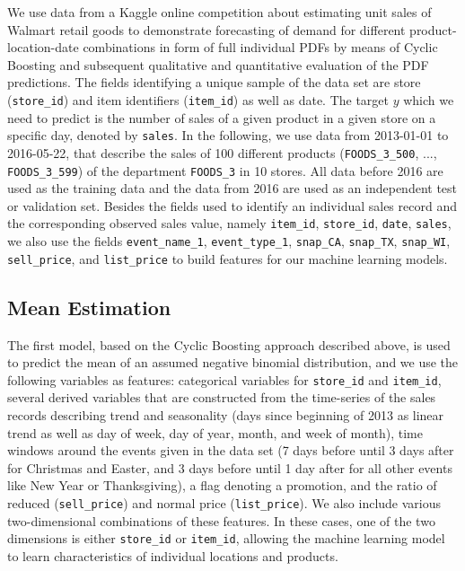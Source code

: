 \documentclass[BCOR=1mm, DIV=calc,10pt,
twoside=true,
twocolumn,
headings=normal]{scrartcl}
\begin{document}
We use data from a Kaggle online competition about estimating unit sales of Walmart retail goods \cite{kaggle_data} to demonstrate forecasting of demand for different product-location-date combinations in form of full individual PDFs by means of Cyclic Boosting and subsequent qualitative and quantitative evaluation of the PDF predictions. The fields identifying a unique sample of the data set are store (\texttt{store\_id}) and item identifiers (\texttt{item\_id}) as well as date. The target $y$ which we need to predict is the number of sales of a given product in a given store on a specific day, denoted by \texttt{sales}. In the following, we use data from 2013-01-01 to 2016-05-22, that describe the sales of 100 different products (\texttt{FOODS\_3\_500}, ..., \texttt{FOODS\_3\_599}) of the department \texttt{FOODS\_3} in 10 stores. All data before 2016 are used as the training data and the data from 2016 are used as an independent test or validation set. Besides the fields used to identify an individual sales record and the corresponding observed sales value, namely \texttt{item\_id}, \texttt{store\_id}, \texttt{date}, \texttt{sales}, we also use the fields \texttt{event\_name\_1}, \texttt{event\_type\_1}, \texttt{snap\_CA}, \texttt{snap\_TX}, \texttt{snap\_WI}, \texttt{sell\_price}, and \texttt{list\_price} to build features for our machine learning models.

\subsection{Mean Estimation}
\label{sec:example_mean}

The first model, based on the Cyclic Boosting approach described above, is used to predict the mean of an assumed negative binomial distribution, and we use the following variables as features: categorical variables for \texttt{store\_id} and \texttt{item\_id}, several derived variables that are constructed from the time-series of the sales records describing trend and seasonality (days since beginning of 2013 as linear trend as well as day of week, day of year, month, and week of month), time windows around the events given in the data set (7 days before until 3 days after for Christmas and Easter, and 3 days before until 1 day after for all other events like New Year or Thanksgiving), a flag denoting a promotion, and the ratio of reduced (\texttt{sell\_price}) and normal price (\texttt{list\_price}). We also include various two-dimensional combinations of these features. In these cases, one of the two dimensions is either \texttt{store\_id} or \texttt{item\_id}, allowing the machine learning model to learn characteristics of individual locations and products.
\end{document}
